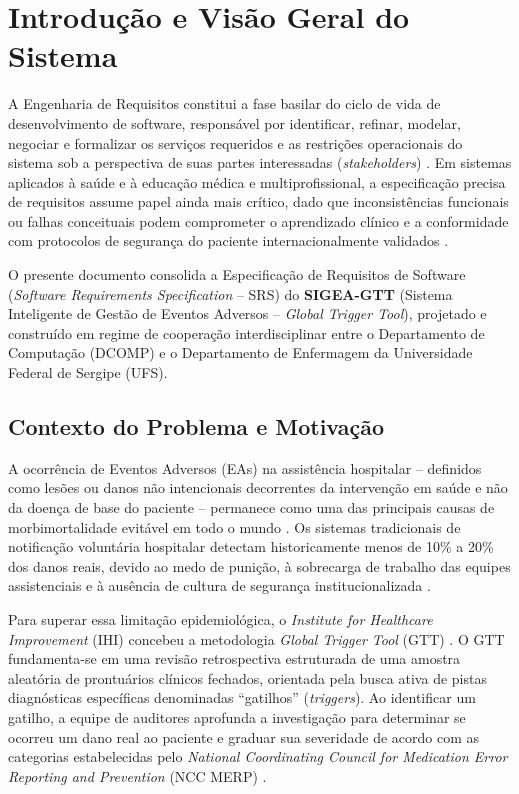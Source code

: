 \chapter{Introdução e Visão Geral do Sistema}
\label{cap_introducao_visao_geral}

A Engenharia de Requisitos constitui a fase basilar do ciclo de vida de desenvolvimento de software, responsável por identificar, refinar, modelar, negociar e formalizar os serviços requeridos e as restrições operacionais do sistema sob a perspectiva de suas partes interessadas (\textit{stakeholders}) \cite{sommerville2019,pressman2021}. Em sistemas aplicados à saúde e à educação médica e multiprofissional, a especificação precisa de requisitos assume papel ainda mais crítico, dado que inconsistências funcionais ou falhas conceituais podem comprometer o aprendizado clínico e a conformidade com protocolos de segurança do paciente internacionalmente validados \cite{kohn2000,who2021global}.

O presente documento consolida a Especificação de Requisitos de Software (\textit{Software Requirements Specification} -- SRS) do \textbf{SIGEA-GTT} (Sistema Inteligente de Gestão de Eventos Adversos -- \textit{Global Trigger Tool}), projetado e construído em regime de cooperação interdisciplinar entre o Departamento de Computação (DCOMP) e o Departamento de Enfermagem da Universidade Federal de Sergipe (UFS).

\section{Contexto do Problema e Motivação}
\label{sec_contexto_problema}

A ocorrência de Eventos Adversos (EAs) na assistência hospitalar -- definidos como lesões ou danos não intencionais decorrentes da intervenção em saúde e não da doença de base do paciente -- permanece como uma das principais causas de morbimortalidade evitável em todo o mundo \cite{kohn2000,classen2011}. Os sistemas tradicionais de notificação voluntária hospitalar detectam historicamente menos de 10\% a 20\% dos danos reais, devido ao medo de punição, à sobrecarga de trabalho das equipes assistenciais e à ausência de cultura de segurança institucionalizada \cite{brennan1991,resende2019gtt}.

Para superar essa limitação epidemiológica, o \textit{Institute for Healthcare Improvement} (IHI) concebeu a metodologia \textit{Global Trigger Tool} (GTT) \cite{griffin2009ihi}. O GTT fundamenta-se em uma revisão retrospectiva estruturada de uma amostra aleatória de prontuários clínicos fechados, orientada pela busca ativa de pistas diagnósticas específicas denominadas ``gatilhos'' (\textit{triggers}). Ao identificar um gatilho, a equipe de auditores aprofunda a investigação para determinar se ocorreu um dano real ao paciente e graduar sua severidade de acordo com as categorias estabelecidas pelo \textit{National Coordinating Council for Medication Error Reporting and Prevention} (NCC MERP) \cite{nccmerp2001index}.

